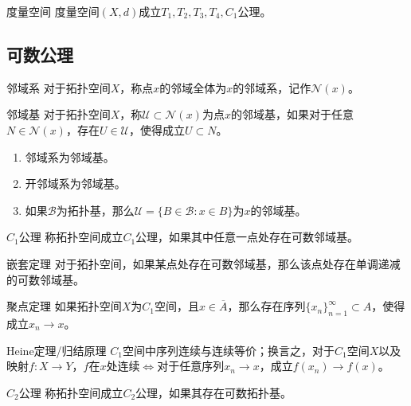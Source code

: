 \documentclass[lang = cn, scheme = chinese, thmcnt = section, usesamecnt]{elegantbook}
\newcommand{\sub}{\subset}             %
\begin{document}
\begin{theorem}{度量空间}
	度量空间$(X,d)$成立$T_1,T_2,T_3,T_4,C_1$公理。
\end{theorem}

\subsection{可数公理}

\begin{definition}{邻域系}
	对于拓扑空间$X$，称点$x$的邻域全体为$x$的邻域系，记作$\mathscr{N}(x)$。
\end{definition}

\begin{definition}{邻域基}
	对于拓扑空间$X$，称$\mathscr{U}\sub\mathscr{N}(x)$为点$x$的邻域基，如果对于任意$N\in\mathscr{N}(x)$，存在$U\in\mathscr{U}$，使得成立$U\sub N$。
\end{definition}

\begin{example}
	\begin{enumerate}
		\item 邻域系为邻域基。
		\item 开邻域系为邻域基。
		\item 如果$\mathscr{B}$为拓扑基，那么$\mathscr{U}=\{ B\in\mathscr{B}:x\in B \}$为$x$的邻域基。
	\end{enumerate}
\end{example}

\begin{definition}{$C_1$公理}
	称拓扑空间成立$C_1$公理，如果其中任意一点处存在可数邻域基。
\end{definition}

\begin{theorem}{嵌套定理}
	对于拓扑空间，如果某点处存在可数邻域基，那么该点处存在单调递减的可数邻域基。
\end{theorem}

\begin{theorem}{聚点定理}
	如果拓扑空间$X$为$C_1$空间，且$x\in \overline{A}$，那么存在序列$\{ x_n \}_{n=1}^{\infty}\sub A$，使得成立$x_n\to x$。
\end{theorem}

\begin{theorem}{Heine定理/归结原理}
	$C_1$空间中序列连续与连续等价；换言之，对于$C_1$空间$X$以及映射$f:X\to Y$，$f$在$x$处连续$\iff$对于任意序列$x_n\to x$，成立$f(x_n)\to f(x)$。
\end{theorem}

\begin{definition}{$C_2$公理}
	称拓扑空间成立$C_2$公理，如果其存在可数拓扑基。
\end{definition}
\end{document}
